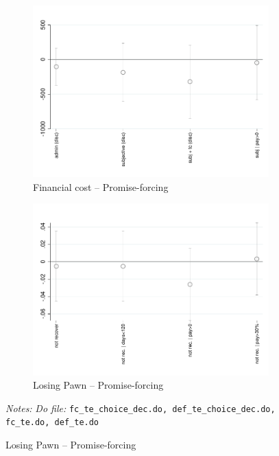 \documentclass[11pt]{article}
\begin{document}
\begin{figure}[H]
\begin{center}
    \bigskip
    \bigskip
    
    \begin{subfigure}{0.45\textwidth}
        \caption{Financial cost -- Promise-forcing}
        \centering
        \includegraphics[width=\textwidth]{Figuras/fc_te_pro_3.pdf}
    \end{subfigure}
    \begin{subfigure}{0.45\textwidth}
        \caption{Losing Pawn -- Promise-forcing}
        \centering
        \includegraphics[width=\textwidth]{Figuras/def_te_pro_3.pdf}
    \end{subfigure}
    \end{center}
             \footnotesize \textit{Notes: } 
      \footnotesize{ } \textit{Do file: }  \texttt{fc\_te\_choice\_dec.do, def\_te\_choice\_dec.do, fc\_te.do, def\_te.do }
\end{figure}
\end{document}
